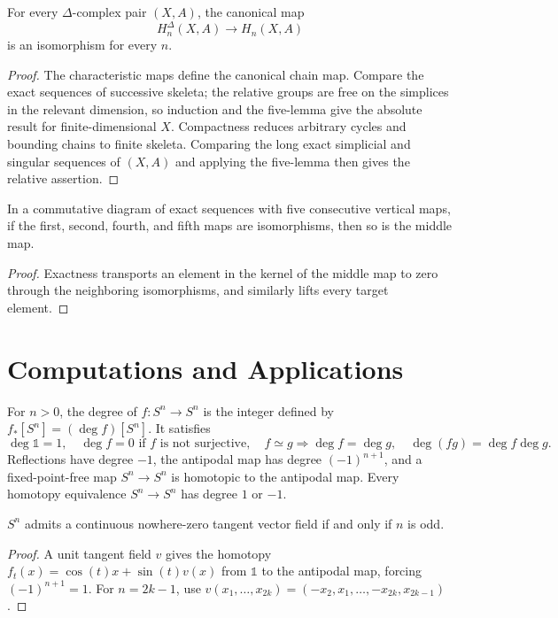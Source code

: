 \begin{theorem}
\label{thm:simplicial-singular-homology-isomorphic}

For every $\Delta$-complex pair $(X,A)$, the canonical map
\[
H_n^\Delta(X,A)\longrightarrow H_n(X,A)
\]
is an isomorphism for every $n$.
\end{theorem}
\begin{proof}
\sketch The characteristic maps define the canonical chain map. Compare the
exact sequences of successive skeleta; the relative groups are free on the
simplices in the relevant dimension, so induction and the five-lemma give the
absolute result for finite-dimensional $X$. Compactness reduces arbitrary
cycles and bounding chains to finite skeleta. Comparing the long exact
simplicial and singular sequences of $(X,A)$ and applying the five-lemma then
gives the relative assertion.
\end{proof}

\begin{lemma}
\label{lem:five-lemma}

In a commutative diagram of exact sequences with five consecutive vertical maps, if the first, second, fourth, and fifth maps are isomorphisms, then so is the middle map.
\end{lemma}
\begin{proof}
\sketch Exactness transports an element in the kernel of the middle map to zero through the neighboring isomorphisms, and similarly lifts every target element.
\end{proof}

\section{Computations and Applications}

For $n>0$, the degree of $f:S^n\to S^n$ is the integer defined by $f_*[S^n]=(\deg f)[S^n]$.  It satisfies
\[
\deg\mathbb{1}=1,\quad \deg f=0\text{ if }f\text{ is not surjective},\quad f\simeq g\Rightarrow\deg f=\deg g,\quad \deg(fg)=\deg f\deg g.
\]
Reflections have degree $-1$, the antipodal map has degree $(-1)^{n+1}$, and a fixed-point-free map $S^n\to S^n$ is homotopic to the antipodal map.
Every homotopy equivalence $S^n\to S^n$ has degree $1$ or $-1$.

\begin{theorem}
\label{thm:tangent-vector-fields-spheres}

$S^n$ admits a continuous nowhere-zero tangent vector field if and only if $n$ is odd.
\end{theorem}
\begin{proof}
\sketch A unit tangent field $v$ gives the homotopy $f_t(x)=\cos(t)x+\sin(t)v(x)$ from $\mathbb{1}$ to the antipodal map, forcing $(-1)^{n+1}=1$.  For $n=2k-1$, use $v(x_1,\ldots,x_{2k})=(-x_2,x_1,\ldots,-x_{2k},x_{2k-1})$.
\end{proof}

